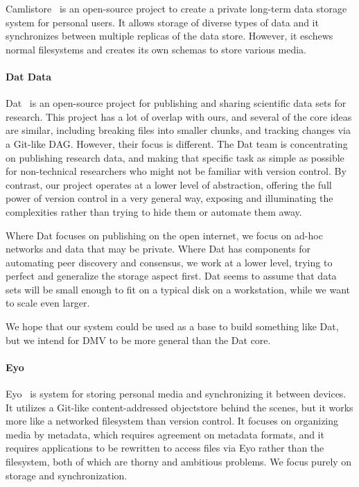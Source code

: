 Camlistore~\cite{camlistore_homepage} is an open-source project to create a private long-term data storage system for personal users.
It allows storage of diverse types of data and it synchronizes between multiple replicas of the data store.
However, it eschews normal filesystems and creates its own schemas to store various media.


\paragraph{Dat Data}

Dat~\cite{dat_homepage} is an open-source project for publishing and sharing scientific data sets for research.
This project has a lot of overlap with ours, and several of the core ideas are similar, including breaking files into smaller chunks, and tracking changes via a Git-like \gls{DAG}.
However, their focus is different.
The Dat team is concentrating on publishing research data, and making that specific task as simple as possible for non-technical researchers who might not be familiar with version control.
By contrast, our project operates at a lower level of abstraction, offering the full power of version control in a very general way, exposing and illuminating the complexities rather than trying to hide them or automate them away.

Where Dat focuses on publishing on the open internet, we focus on ad-hoc networks and data that may be private.
Where Dat has components for automating peer discovery and consensus, we work at a lower level, trying to perfect and generalize the storage aspect first.
Dat seems to assume that data sets will be small enough to fit on a typical disk on a workstation, while we want to scale even larger.

We hope that our system could be used as a base to build something like Dat, but we intend for \gls{DMV} to be more general than the Dat core.


\paragraph{Eyo}

Eyo~\cite{Strauss:2011:EDP:2002181.2002216} is system for storing personal media and synchronizing it between devices.
It utilizes a Git-like content-addressed \gls{objectstore} behind the scenes, but it works more like a networked filesystem than version control.
It focuses on organizing media by metadata, which requires agreement on metadata formats, and it requires applications to be rewritten to access files via Eyo rather than the filesystem, both of which are thorny and ambitious problems.
We focus purely on storage and synchronization.


